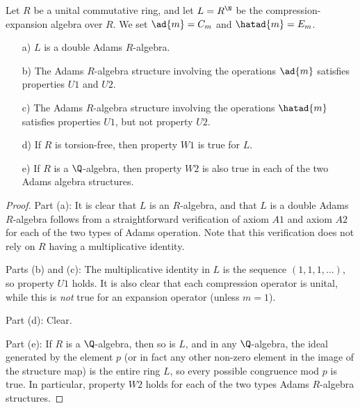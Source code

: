 \documentclass[a4paper]{article}
\begin{document}
\begin{lemma} \label{lemma:CE}
Let $R$ be a unital commutative ring, and let $L = R^{\N}$ be the compression-expansion algebra over $R$. We set $\ad{m} = C_m$ and $\hatad{m} = E_m$.
\begin{itemize}
\item[a)] $L$ is a double Adams $R$-algebra. 
\item[b)] The Adams $R$-algebra structure involving the operations $\ad{m}$ satisfies properties $U1$ and $U2$.
\item[c)] The Adams $R$-algebra structure involving the operations $\hatad{m}$ satisfies properties $U1$, but not property $U2$.
\item[d)] If $R$ is torsion-free, then property $W1$ is true for $L$.
\item[e)] If $R$ is a $\Q$-algebra, then property $W2$ is also true in each of the two Adams algebra structures.
\end{itemize}
\end{lemma}


\begin{proof}
Part (a): It is clear that $L$ is an $R$-algebra, and that $L$ is a double Adams $R$-algebra follows from a straightforward verification of axiom $A1$ and axiom $A2$ for each of the two types of Adams operation. Note that this verification does not rely on $R$ having a multiplicative identity. 

Parts (b) and (c): The multiplicative identity in $L$ is the sequence $(1, 1, 1, \ldots)$, so property $U1$ holds. It is also clear that each compression operator is unital, while this is \emph{not} true for an expansion operator (unless $m = 1$).

Part (d): Clear.

Part (e): If $R$ is a $\Q$-algebra, then so is $L$, and in any $\Q$-algebra, the ideal generated by the element $p$ (or in fact any other non-zero element in the image of the structure map) is the entire ring $L$, so every possible congruence mod $p$ is true. In particular, property $W2$ holds for each of the two types Adams $R$-algebra structures.

\end{proof}
\end{document}

